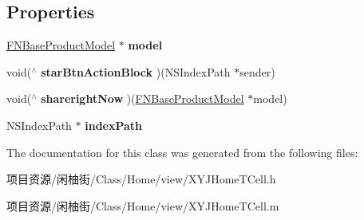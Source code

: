 \subsection*{Properties}
\begin{DoxyCompactItemize}
\item 
\mbox{\label{interface_x_y_j_home_t_cell_ac8a8695a55a23a12043beb83623a150e}} 
\mbox{\hyperlink{interface_f_n_base_product_model}{F\+N\+Base\+Product\+Model}} $\ast$ {\bfseries model}
\item 
\mbox{\label{interface_x_y_j_home_t_cell_aede63487766da3557cb2bc402397a5bf}} 
void($^\wedge$ {\bfseries star\+Btn\+Action\+Block} )(N\+S\+Index\+Path $\ast$sender)
\item 
\mbox{\label{interface_x_y_j_home_t_cell_a9321a2ca8cf9c2a42f19960024b1106d}} 
void($^\wedge$ {\bfseries shareright\+Now} )(\mbox{\hyperlink{interface_f_n_base_product_model}{F\+N\+Base\+Product\+Model}} $\ast$model)
\item 
\mbox{\label{interface_x_y_j_home_t_cell_a1dc55f630b734a3164f0aa58fecda635}} 
N\+S\+Index\+Path $\ast$ {\bfseries index\+Path}
\end{DoxyCompactItemize}


The documentation for this class was generated from the following files\+:\begin{DoxyCompactItemize}
\item 
项目资源/闲柚街/\+Class/\+Home/view/X\+Y\+J\+Home\+T\+Cell.\+h\item 
项目资源/闲柚街/\+Class/\+Home/view/X\+Y\+J\+Home\+T\+Cell.\+m\end{DoxyCompactItemize}
